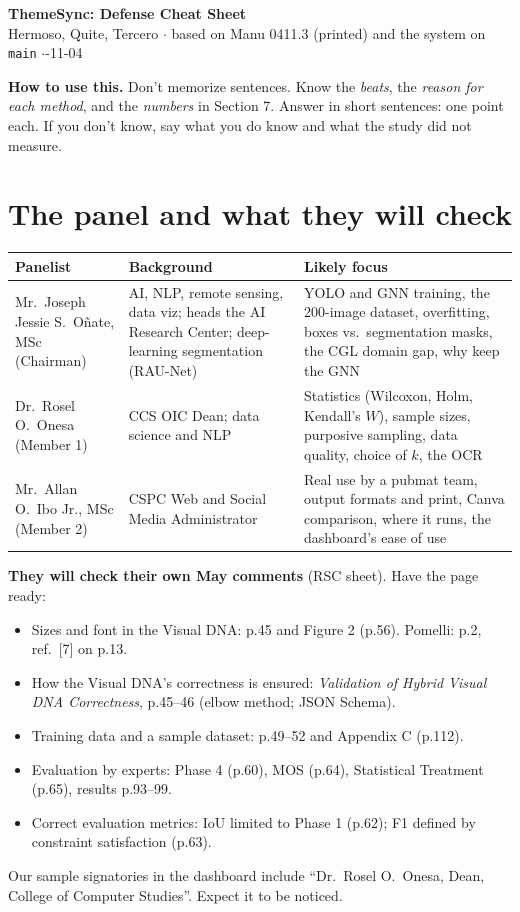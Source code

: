 \documentclass[10pt,a4paper]{article}
\begin{document}
\begin{center}
{\LARGE\bfseries\color{navy} ThemeSync: Defense Cheat Sheet}\\[2pt]
{\small Hermoso, Quite, Tercero \;$\cdot$\; based on Manu 0411.3 (printed) and the system on \texttt{main} \;$\cdot$-11-04}
\end{center}

\begin{key}
\textbf{How to use this.} Don't memorize sentences. Know the \emph{beats}, the \emph{reason for each method}, and the \emph{numbers} in Section 7. Answer in short sentences: one point each. If you don't know, say what you do know and what the study did not measure.
\end{key}

\section{The panel and what they will check}

\begin{tabularx}{\linewidth}{@{}p{3.4cm}p{4.6cm}X@{}}
\toprule
\textbf{Panelist} & \textbf{Background} & \textbf{Likely focus} \\
\midrule
Mr.\ Joseph Jessie S.\ Oñate, MSc (Chairman) & AI, NLP, remote sensing, data viz; heads the AI Research Center; deep-learning segmentation (RAU-Net) & YOLO and GNN training, the 200-image dataset, overfitting, boxes vs.\ segmentation masks, the CGL domain gap, why keep the GNN \\
Dr.\ Rosel O.\ Onesa (Member 1) & CCS OIC Dean; data science and NLP & Statistics (Wilcoxon, Holm, Kendall's $W$), sample sizes, purposive sampling, data quality, choice of $k$, the OCR \\
Mr.\ Allan O.\ Ibo Jr., MSc (Member 2) & CSPC Web and Social Media Administrator & Real use by a pubmat team, output formats and print, Canva comparison, where it runs, the dashboard's ease of use \\
\bottomrule
\end{tabularx}

\smallskip
\textbf{They will check their own May comments} (RSC sheet). Have the page ready:
\begin{itemize}
\item Sizes and font in the Visual DNA: p.45 and Figure 2 (p.56). \quad Pomelli: p.2, ref.\ [7] on p.13.
\item How the Visual DNA's correctness is ensured: \emph{Validation of Hybrid Visual DNA Correctness}, p.45--46 (elbow method; JSON Schema).
\item Training data and a sample dataset: p.49--52 and Appendix C (p.112).
\item Evaluation by experts: Phase 4 (p.60), MOS (p.64), Statistical Treatment (p.65), results p.93--99.
\item Correct evaluation metrics: IoU limited to Phase 1 (p.62); F1 defined by constraint satisfaction (p.63).
\end{itemize}
Our sample signatories in the dashboard include ``Dr.\ Rosel O.\ Onesa, Dean, College of Computer Studies''. Expect it to be noticed.
\end{document}
